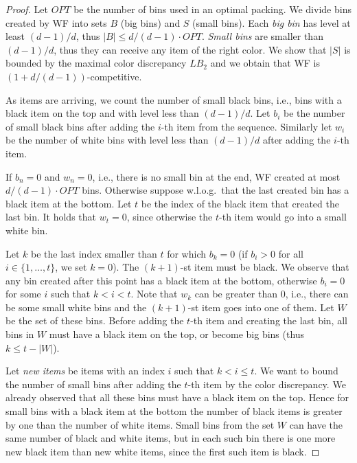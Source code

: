 \documentclass[11pt,a4paper]{article}
\def\vari#1{\mathit{#1}}
\begin{document}
\begin{proof}
Let $\vari{OPT}$ be the number of bins used in an optimal packing.
We divide bins created by WF into sets $B$ (big bins) and $S$ (small bins).
Each \textit{big bin} has level at least $(d - 1)/d$, thus $|B| \leq d/(d-1) \cdot \vari{OPT}$.
\textit{Small bins} are smaller than $(d - 1)/d$, thus they can receive any item of the right color.
We show that $|S|$ is bounded by the maximal color discrepancy $\vari{LB_2}$ and we obtain that WF is $(1 + d/(d-1))$-competitive.

As items are arriving, we count the number of small black bins, i.e.,
bins with a black item on the top and with level less than $(d - 1)/d$.
Let $b_i$ be the number of small black bins after adding the $i$-th item from the sequence.
Similarly let $w_i$ be the number of white bins with level less than $(d - 1)/d$ after adding the $i$-th item. 

If $b_n = 0$ and $w_n = 0$, i.e., there is no small bin at the end, WF created at most $d/(d-1) \cdot \vari{OPT}$ bins.
Otherwise suppose w.l.o.g.\ that the last created bin has a black item at the bottom.
Let $t$ be the index of the black item that created the last bin.
It holds that $w_t = 0$, since otherwise the $t$-th item would go into a small white bin.

Let $k$ be the last index smaller than $t$ for which $b_k = 0$ (if $b_i > 0$ for all $i\in\{1, \dots, t \}$, we set $k = 0$).
The $(k + 1)$-st item must be black.
We observe that any bin created after this point has a black item at the bottom,
otherwise $b_i = 0$ for some $i$ such that $k < i < t$.
Note that $w_k$ can be greater than $0$, i.e., there can be some small white bins
and the $(k + 1)$-st item goes into one of them.
Let $W$ be the set of these bins.
Before adding the $t$-th item and creating the last bin, all bins in $W$ must have a black item on the top, or become big bins (thus $k \leq t - |W|$).

Let \textit{new items} be items with an index $i$ such that $k < i \leq t$.
We want to bound the number of small bins after adding the $t$-th item by the color discrepancy.
We already observed that all these bins must have a black item on the top.
Hence for small bins with a black item at the bottom the number of black items is greater by one than the number of white items.
Small bins from the set $W$ can have the same number of black and white items,
but in each such bin there is one more new black item than new white items, since the first such item is black.


\end{proof}
\end{document}

